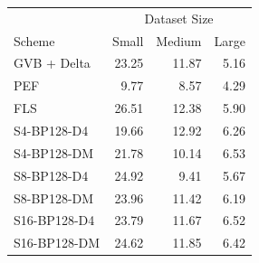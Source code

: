 \begin{tabular}{lrrr}
\toprule
 & \multicolumn{3}{c}{Dataset Size} \\
Scheme & Small & Medium & Large \\
\midrule
GVB + Delta & 23.25 & 11.87 & 5.16 \\
PEF & 9.77 & 8.57 & 4.29 \\
FLS & 26.51 & 12.38 & 5.90 \\
S4-BP128-D4 & 19.66 & 12.92 & 6.26 \\
S4-BP128-DM & 21.78 & 10.14 & 6.53 \\
S8-BP128-D4 & 24.92 & 9.41 & 5.67 \\
S8-BP128-DM & 23.96 & 11.42 & 6.19 \\
S16-BP128-D4 & 23.79 & 11.67 & 6.52 \\
S16-BP128-DM & 24.62 & 11.85 & 6.42 \\
\bottomrule
\end{tabular}
